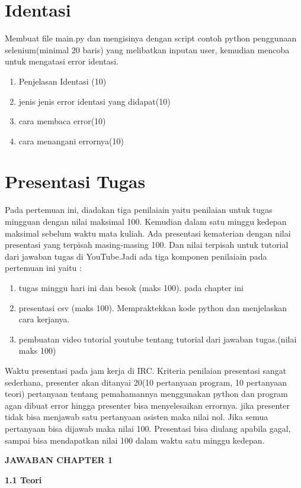 \section{Identasi}
Membuat file main.py dan mengisinya dengan script contoh python penggunaan selenium(minimal 20 baris) yang melibatkan inputan user, kemudian mencoba untuk mengatasi error identasi.
\begin{enumerate}
	\item
Penjelasan Identasi (10)
	\item
jenis jenis error identasi yang didapat(10)
\item
cara membaca error(10)
\item 
cara menangani errornya(10)
\end{enumerate}

\section{Presentasi Tugas}
Pada pertemuan ini, diadakan tiga penilaiain yaitu penilaian untuk tugas mingguan dengan nilai maksimal 100. Kemudian dalam satu minggu kedepan maksimal sebelum waktu mata kuliah. Ada presentasi kematerian dengan nilai presentasi yang terpisah masing-masing 100. Dan nilai terpisah untuk tutorial dari jawaban tugas di YouTube.Jadi ada tiga komponen penilaiain pada pertemuan ini yaitu :
\begin{enumerate}
	\item tugas minggu hari ini dan besok (maks 100). pada chapter ini
	\item presentasi csv (maks 100). Mempraktekkan kode python dan menjelaskan cara kerjanya.
	\item pembuatan video tutorial youtube tentang tutorial dari jawaban tugas.(nilai maks 100)
\end{enumerate}
Waktu presentasi pada jam kerja di IRC. Kriteria penilaian presentasi sangat sederhana, presenter akan ditanyai 20(10 pertanyaan program, 10 pertanyaan teori) pertanyaan tentang pemahamannya menggunakan python dan program agan dibuat error hingga presenter bisa menyelesaikan errornya. jika presenter tidak bisa menjawab satu pertanyaan asisten maka nilai nol. Jika semua pertanyaan bisa dijawab maka nilai 100. Presentasi bisa diulang apabila gagal, sampai bisa mendapatkan nilai 100 dalam waktu satu minggu kedepan.
\par
\textbf{JAWABAN CHAPTER 1}
\par
\textbf{1.1 Teori}
